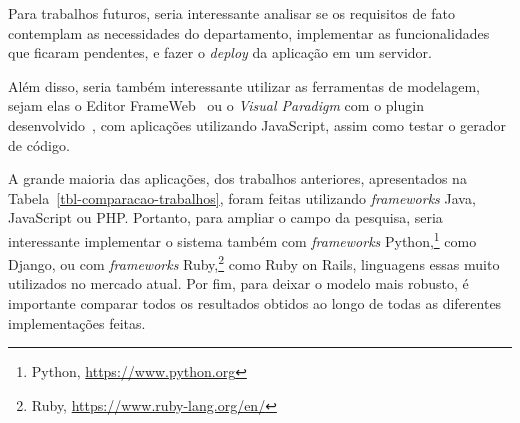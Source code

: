 
Para trabalhos futuros, seria interessante analisar se os requisitos de fato contemplam as necessidades do departamento,
implementar as funcionalidades que ficaram pendentes, e fazer o \textit{deploy} da aplicação em um servidor.

Além disso, seria também interessante utilizar as ferramentas de modelagem, sejam elas o Editor FrameWeb~\cite{campos:2017} ou o \textit{Visual Paradigm} com o plugin desenvolvido~\cite{silva:2023},
com aplicações utilizando JavaScript, assim como testar o gerador de código.

A grande maioria das aplicações, dos trabalhos anteriores, apresentados na Tabela~\ref*{tbl-comparacao-trabalhos}, foram feitas utilizando \textit{frameworks} Java, JavaScript ou PHP. Portanto, para ampliar
o campo da pesquisa, seria interessante
implementar o sistema também com \textit{frameworks} Python,\footnote{Python, \url{https://www.python.org}} como Django, ou com \textit{frameworks} Ruby,\footnote{Ruby, \url{https://www.ruby-lang.org/en/}} como Ruby on Rails,
linguagens essas muito utilizados no mercado atual.
Por fim, para deixar o modelo mais robusto, é importante comparar todos os resultados obtidos ao longo de todas as diferentes implementações feitas.




